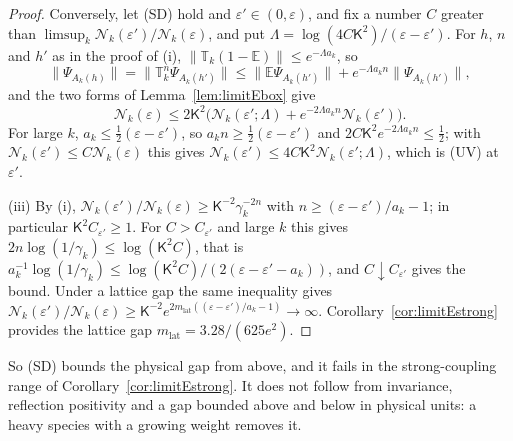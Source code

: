 \documentclass[aps,prd,twocolumn,superscriptaddress,nofootinbib,longbibliography,floatfix,amsmath,amssymb,10pt]{revtex4-2}
\theoremstyle{definition}
\theoremstyle{remark}
\begin{document}
\begin{proof}
Conversely, let (SD) hold and $\varepsilon'\in(0,\varepsilon)$, and fix a
number $C$ greater than $\limsup_k\mathcal N_k(\varepsilon')/\mathcal
N_k(\varepsilon)$, and put $\Lambda=\log(4C\mathsf K^2)/(\varepsilon-
\varepsilon')$. For $h$, $n$ and $h'$ as in the proof of (i), $\|\mathbb T_k(1-\mathbb E)\|\le
e^{-\Lambda a_k}$, so
\[
\|\Psi_{A_k(h)}\|=\|\mathbb T_k^n\Psi_{A_k(h')}\|\le\|\mathbb E
\Psi_{A_k(h')}\|+e^{-\Lambda a_kn}\|\Psi_{A_k(h')}\|,
\]
and the two forms of Lemma~\ref{lem:limitEbox} give
\[
\mathcal N_k(\varepsilon)\le2\mathsf K^2\bigl(\mathcal N_k(\varepsilon';
\Lambda)+e^{-2\Lambda a_kn}\mathcal N_k(\varepsilon')\bigr).
\]
For large $k$, $a_k\le
\frac12(\varepsilon-\varepsilon')$, so $a_kn\ge\frac12(\varepsilon-
\varepsilon')$ and $2C\mathsf K^2e^{-2\Lambda a_kn}\le\frac12$; with
$\mathcal N_k(\varepsilon')\le C\mathcal N_k(\varepsilon)$ this gives
$\mathcal N_k(\varepsilon')\le4C\mathsf K^2\mathcal
N_k(\varepsilon';\Lambda)$, which is (UV) at $\varepsilon'$.

(iii) By (i), $\mathcal N_k(\varepsilon')/\mathcal N_k(\varepsilon)\ge
\mathsf K^{-2}\gamma_k^{-2n}$ with $n\ge(\varepsilon-\varepsilon')/a_k-1$;
in particular $\mathsf K^2C_{\varepsilon'}\ge1$. For $C>C_{\varepsilon'}$
and large $k$ this gives $2n\log(1/\gamma_k)\le\log(\mathsf K^2C)$, that is
$a_k^{-1}\log(1/\gamma_k)\le\log(\mathsf K^2C)/(2(\varepsilon-\varepsilon'
-a_k))$, and $C\downarrow C_{\varepsilon'}$ gives the bound. Under a lattice
gap the same inequality gives $\mathcal N_k(\varepsilon')/\mathcal
N_k(\varepsilon)\ge\mathsf K^{-2}e^{2m_{\mathrm{lat}}((\varepsilon-
\varepsilon')/a_k-1)}\to\infty$. Corollary~\ref{cor:limitEstrong} provides
the lattice gap $m_{\mathrm{lat}}=3.28/(625e^2)$.
\end{proof}

So (SD) bounds the physical gap from above, and it fails in the
strong-coupling range of Corollary~\ref{cor:limitEstrong}. It does not
follow from invariance, reflection positivity and a gap bounded above and
below in physical units: a heavy species with a growing weight removes it.
\end{document}
